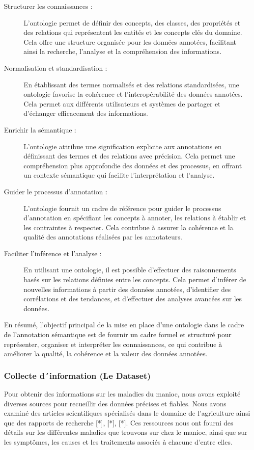\documentclass{article}
\begin{document}
	\begin{description}
		\item[Structurer les connaissances : ]L'ontologie permet de définir des concepts, des classes, des propriétés et des relations qui représentent les entités et les concepts clés du domaine. Cela offre une structure organisée pour les données annotées, facilitant ainsi la recherche, l'analyse et la compréhension des informations.
		
		\item[Normalisation et standardisation : ]En établissant des termes normalisés et des relations standardisées, une ontologie favorise la cohérence et l'interopérabilité des données annotées. Cela permet aux différents utilisateurs et systèmes de partager et d'échanger efficacement des informations.
		
		\item[Enrichir la sémantique :] L'ontologie attribue une signification explicite aux annotations en définissant des termes et des relations avec précision. Cela permet une compréhension plus approfondie des données et des processus, en offrant un contexte sémantique qui facilite l'interprétation et l'analyse.
		
		\item[Guider le processus d'annotation : ]L'ontologie fournit un cadre de référence pour guider le processus d'annotation en spécifiant les concepts à annoter, les relations à établir et les contraintes à respecter. Cela contribue à assurer la cohérence et la qualité des annotations réalisées par les annotateurs.
		
		\item[Faciliter l'inférence et l'analyse :]En utilisant une ontologie, il est possible d'effectuer des raisonnements basés sur les relations définies entre les concepts. Cela permet d'inférer de nouvelles informations à partir des données annotées, d'identifier des corrélations et des tendances, et d'effectuer des analyses avancées sur les données.
		
	
	\end{description}
	
		En résumé, l'objectif principal de la mise en place d'une ontologie dans le cadre de l'annotation sémantique est de fournir un cadre formel et structuré pour représenter, organiser et interpréter les connaissances, ce qui contribue à améliorer la qualité, la cohérence et la valeur des données annotées. \\
		
		
		\subsubsection{Collecte d´information (Le Dataset)}
		Pour obtenir des informations sur les maladies du manioc, nous avons exploité diverses sources pour recueillir des données précises et fiables. Nous avons examiné des articles scientifiques spécialisés dans le domaine de l'agriculture ainsi que des rapports de recherche [*], [*], [*]. Ces ressources nous ont fourni des détails sur les différentes maladies que trouvons sur chez le manioc, ainsi que sur les symptômes, les causes et les traitements associés à chacune d'entre elles.
		
\end{document}
